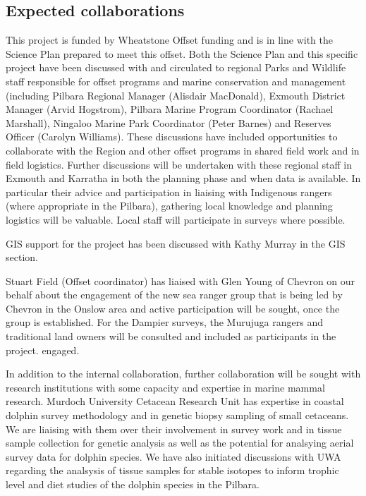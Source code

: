 \documentclass[version=last,
    paper=a4,                               %
    10pt,                                   %
    dvipsnames,
    oneside,                              %
    headings=openany,                       %
    open=any,
    BCOR=7mm,                               %
    DIV=15,     %
]{scrbook}
\begin{document}
\subsection*{Expected collaborations}

This project is funded by Wheatstone Offset funding and is in line with
the Science Plan prepared to meet this offset. Both the Science Plan and
this specific project have been discussed with and circulated to
regional Parks and Wildlife staff responsible for offset programs and
marine conservation and management (including Pilbara Regional Manager
(Alisdair MacDonald), Exmouth District Manager (Arvid Hogstrom), Pilbara
Marine Program Coordinator (Rachael Marshall), Ningaloo Marine Park
Coordinator (Peter Barnes) and Reserves Officer (Carolyn Williams).
These discussions have included opportunities to collaborate with the
Region and other offset programs in shared field work and in field
logistics. Further discussions will be undertaken with these regional
staff in Exmouth and Karratha in both the planning phase and when data
is available. In particular their advice and participation in liaising
with Indigenous rangers (where appropriate in the Pilbara), gathering
local knowledge and planning logistics will be valuable. Local staff
will participate in surveys where possible.

GIS support for the project has been discussed with Kathy Murray in the
GIS section.

Stuart Field (Offset coordinator) has liaised with Glen Young of Chevron
on our behalf about the engagement of the new sea ranger group that is
being led by Chevron in the Onslow area and active participation will be
sought, once the group is established. For the Dampier surveys, the
Murujuga rangers and traditional land owners will be consulted and
included as participants in the project. engaged.

In addition to the internal collaboration, further collaboration will be
sought with research institutions with some capacity and expertise in
marine mammal research. Murdoch University Cetacean Research Unit has
expertise in coastal dolphin survey methodology and in genetic biopsy
sampling of small cetaceans. We are liaising with them over their
involvement in survey work and in tissue sample collection for genetic
analysis as well as the potential for analsying aerial survey data for
dolphin species. We have also initiated discussions with UWA regarding
the analsysis of tissue samples for stable isotopes to inform trophic
level and diet studies of the dolphin species in the Pilbara.
\end{document}
